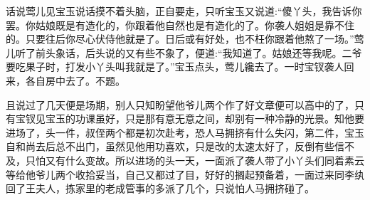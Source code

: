 


\begin{parag}
    话说莺儿见宝玉说话摸不着头脑，正自要走，只听宝玉又说道:“傻丫头，我告诉你罢。你姑娘既是有造化的，你跟着他自然也是有造化的了。你袭人姐姐是靠不住的。只要往后你尽心伏侍他就是了。日后或有好处，也不枉你跟着他熬了一场。”莺儿听了前头象话，后头说的又有些不象了，便道:“我知道了。姑娘还等我呢。二爷要吃果子时，打发小丫头叫我就是了。”宝玉点头，莺儿纔去了。一时宝钗袭人回来，各自房中去了。不题。
\end{parag}


\begin{parag}
    且说过了几天便是场期，别人只知盼望他爷儿两个作了好文章便可以高中的了，只有宝钗见宝玉的功课虽好，只是那有意无意之间，却别有一种冷静的光景。知他要进场了，头一件，叔侄两个都是初次赴考，恐人马拥挤有什么失闪，第二件，宝玉自和尚去后总不出门，虽然见他用功喜欢，只是改的太速太好了，反倒有些信不及，只怕又有什么变故。所以进场的头一天，一面派了袭人带了小丫头们同着素云等给他爷儿两个收拾妥当，自己又都过了目，好好的搁起预备着，一面过来同李纨回了王夫人，拣家里的老成管事的多派了几个，只说怕人马拥挤碰了。
\end{parag}



